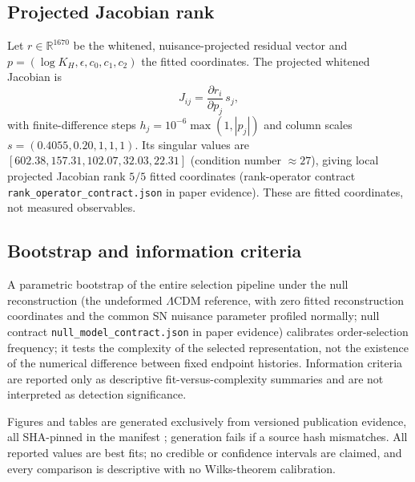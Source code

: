 \subsection{Projected Jacobian rank}

Let $r\in\mathbb{R}^{1670}$ be the whitened, nuisance-projected
residual vector and $p=(\log K_{H},\epsilon,c_{0},c_{1},c_{2})$ the
fitted coordinates. The projected whitened Jacobian is
\begin{equation}
  J_{ij} = \frac{\partial r_{i}}{\partial p_{j}}\,s_{j},
  \label{eq:jacobian}
\end{equation}
with finite-difference steps $h_{j}=10^{-6}\max(1,|p_{j}|)$ and column
scales $s=(0.4055,0.20,1,1,1)$. Its singular values are
$[602.38,157.31,102.07,32.03,22.31]$ (condition number $\approx27$),
giving local projected Jacobian rank $5/5$ fitted coordinates
(rank-operator contract \texttt{rank\_operator\_contract.json} in
paper evidence).
These are fitted coordinates, not measured observables.

\subsection{Bootstrap and information criteria}

A parametric bootstrap of the entire selection pipeline under the
null reconstruction (the undeformed $\Lambda$CDM reference, with zero fitted reconstruction coordinates and the common SN nuisance parameter profiled normally; null contract \texttt{null\_model\_contract.json} in paper
evidence)
calibrates order-selection frequency; it tests the complexity of the
selected representation, not the existence of the numerical difference
between fixed endpoint histories. Information criteria are reported only as descriptive fit-versus-complexity summaries and are not interpreted as detection significance.

Figures and tables are generated exclusively from versioned publication evidence,
all SHA-pinned in the manifest ;
generation fails if a source hash mismatches. All reported
values are best fits; no credible or confidence intervals are claimed,
and every comparison is descriptive with no Wilks-theorem calibration.
